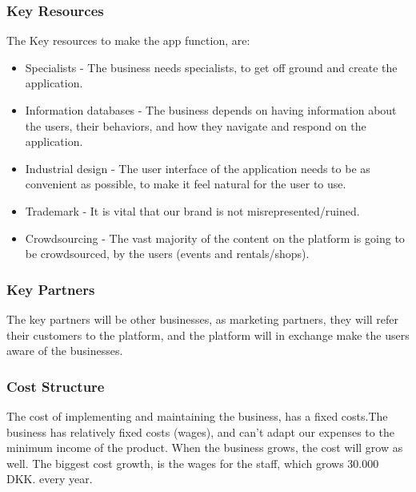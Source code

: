 \subsubsection{Key Resources}
The Key resources to make the app function, are:
\begin{itemize}
	\item Specialists - The business needs specialists, to get off ground and create the application.
	\item Information databases - The business depends on having information about the users, their behaviors, and how they navigate and respond on the application.
	\item Industrial design - The user interface of the application needs to be as convenient as possible, to make it feel natural for the user to use.
	\item Trademark - It is vital that our brand is not misrepresented/ruined.
	\item Crowdsourcing - The vast majority of the content on the platform is going to be crowdsourced, by the users (events and rentals/shops).
\end{itemize}

\subsubsection{Key Partners}
The key partners will be other businesses, as marketing partners, they will refer their customers to the platform, and the platform will in exchange make the users aware of the businesses.

\subsubsection{Cost Structure}
The cost of implementing and maintaining the business, has a fixed costs.The business has relatively fixed costs (wages), and can't adapt our expenses to the minimum income of the product. When the business grows, the cost will grow as well. The biggest cost growth, is the wages for the staff, which grows 30.000 DKK. every year. 
